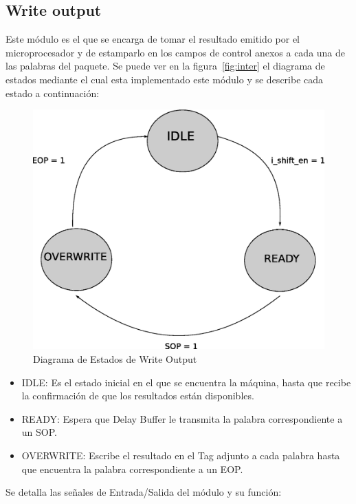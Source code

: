 \newpage

\subsection{Write output}

Este módulo es el que se encarga de tomar el resultado emitido por el microprocesador y de estamparlo en los campos de control anexos a cada una de las palabras del paquete. Se puede ver en la figura~\ref{fig:inter} el diagrama de estados mediante el cual esta implementado este módulo y se describe cada estado a continuación:

\begin{figure}[H]
  \centering
	\includegraphics[scale=0.45]{3-arquitectura/graf/estwritecompleto.eps}
  \caption{Diagrama de Estados de Write Output}
  \label{fig:estuplink}
\end{figure}

\begin{itemize}
	\item IDLE: Es el estado inicial en el que se encuentra la máquina, hasta que recibe la confirmación de que los resultados están disponibles.
	\item READY: Espera que Delay Buffer le transmita la palabra correspondiente a un SOP. 
	\item OVERWRITE: Escribe el resultado en el Tag adjunto a cada palabra hasta que encuentra la palabra correspondiente a un EOP. 
\end{itemize}

Se detalla las señales de Entrada/Salida del módulo y su función:

